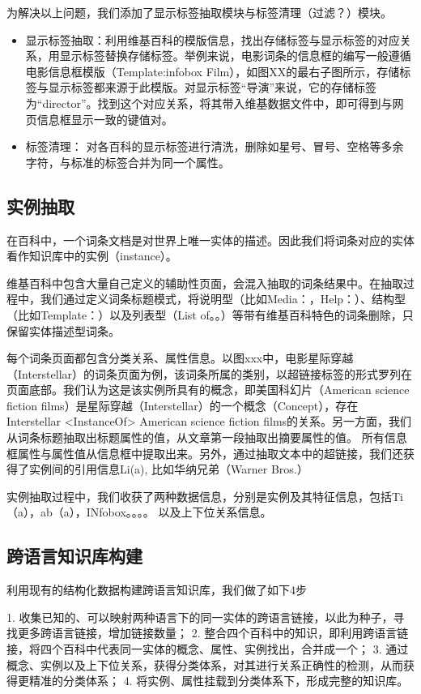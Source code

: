 为解决以上问题，我们添加了显示标签抽取模块与标签清理（过滤？）模块。

\begin{itemize}
\item 显示标签抽取：利用维基百科的模版信息，找出存储标签与显示标签的对应关系，用显示标签替换存储标签。举例来说，电影词条的信息框的编写一般遵循电影信息框模版（Template:infobox Film），如图XX的最右子图所示，存储标签与显示标签都来源于此模版。对显示标签“导演”来说，它的存储标签为“director”。找到这个对应关系，将其带入维基数据文件中，即可得到与网页信息框显示一致的键值对。
\item 标签清理： 对各百科的显示标签进行清洗，删除如星号、冒号、空格等多余字符，与标准的标签合并为同一个属性。
\end{itemize}

\subsection{实例抽取}

在百科中，一个词条文档是对世界上唯一实体的描述。因此我们将词条对应的实体看作知识库中的实例（instance）。

维基百科中包含大量自己定义的辅助性页面，会混入抽取的词条结果中。在抽取过程中，我们通过定义词条标题模式，将说明型（比如Media：，Help：）、结构型（比如Template：）以及列表型（List of。。）等带有维基百科特色的词条删除，只保留实体描述型词条。

每个词条页面都包含分类关系、属性信息。以图xxx中，电影星际穿越（Interstellar）的词条页面为例，该词条所属的类别，以超链接标签的形式罗列在页面底部。我们认为这是该实例所具有的概念，即美国科幻片（American science fiction films）是星际穿越（Interstellar）的一个概念（Concept），存在 Interstellar <InstanceOf> American science fiction films的关系。另一方面，我们从词条标题抽取出标题属性的值，从文章第一段抽取出摘要属性的值。 所有信息框属性与属性值从信息框中提取出来。另外，通过抽取文本中的超链接，我们还获得了实例间的引用信息Li(a), 比如华纳兄弟（Warner Bros.） 

实例抽取过程中，我们收获了两种数据信息，分别是实例及其特征信息，包括Ti（a），ab（a），INfobox。。。。 以及上下位关系信息。

\subsection{跨语言知识库构建}

利用现有的结构化数据构建跨语言知识库，我们做了如下4步

1.  收集已知的、可以映射两种语言下的同一实体的跨语言链接，以此为种子，寻找更多跨语言链接，增加链接数量；
2.  整合四个百科中的知识，即利用跨语言链接，将四个百科中代表同一实体的概念、属性、实例找出，合并成一个；
3.  通过概念、实例以及上下位关系，获得分类体系，对其进行关系正确性的检测，从而获得更精准的分类体系；
4.  将实例、属性挂载到分类体系下，形成完整的知识库。

